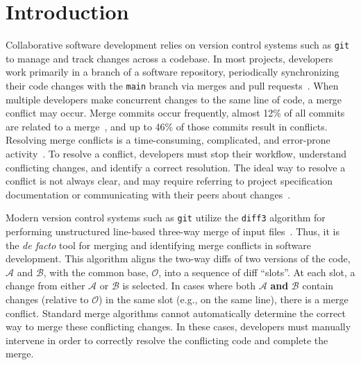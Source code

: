 \section{Introduction}

Collaborative software development relies on version control systems such as \texttt{git} to manage and track changes across a codebase. In most projects, developers work primarily in a branch of a software repository, periodically synchronizing their code changes with the \texttt{main} branch via merges and pull requests~\citep{gousios2016work}. When multiple developers make concurrent changes to the same line of code, a merge conflict may occur.
Merge commits occur frequently, almost 12\% of all commits are related to a merge~\cite{ghiotto2018nature}, and up to 46\% of those commits result in conflicts. Resolving merge conflicts is a time-consuming, complicated, and error-prone activity~\cite{bird2012assessing}. 
To resolve a conflict, developers must stop their workflow, understand conflicting changes, and identify a correct resolution. The ideal way to resolve a conflict is not always clear, and may require referring to project specification documentation or communicating with their peers about changes~\cite{brun2011proactive,de2019recommending,nelson2019life,guimaraes2012improving,bird2012assessing}. 

Modern version control systems such as \texttt{git} utilize the \texttt{diff3} algorithm for performing unstructured line-based three-way merge of input files~\citep{smith-98}. Thus, it is the \emph{de facto} tool for merging and identifying merge conflicts in software development.
This algorithm aligns the two-way diffs of two versions of the code, $\mathcal{A}$ and $\mathcal{B}$, with the common base, $\mathcal{O}$, into a sequence of diff ``slots''.  
At each slot, a change from either $\mathcal{A}$ or $\mathcal{B}$ is selected. 
In cases where both $\mathcal{A}$ \textbf{and} $\mathcal{B}$ contain changes (relative to $\mathcal{O}$) in the same slot (e.g., on the same line), there is a merge conflict.  Standard merge algorithms cannot automatically determine the correct way to merge these conflicting changes. In these cases, developers must manually intervene in order to correctly resolve the conflicting code and complete the merge. 

